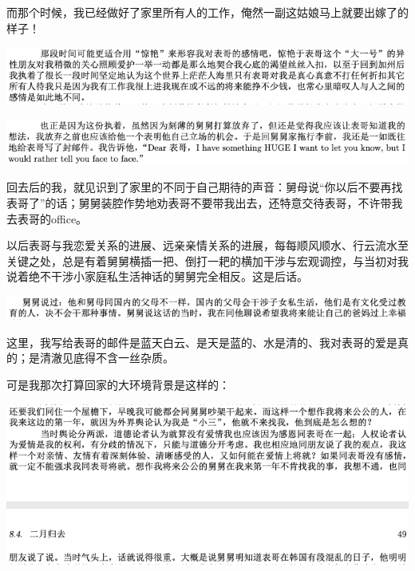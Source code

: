 \documentclass[9pt, b5paper]{article}
\begin{document}
而那个时候，我已经做好了家里所有人的工作，俺然一副这姑娘马上就要出嫁了的样子！

\begin{center}
\includegraphics[width=.9\linewidth]{./pic/p1p49-0.png}
\end{center}

\begin{center}
\includegraphics[width=.9\linewidth]{./pic/p1p49.png}
\end{center}

回去后的我，就见识到了家里的不同于自己期待的声音：舅母说“你以后不要再找表哥了”的话；舅舅装腔作势地劝表哥不要带我出去，还特意交待表哥，不许带我去表哥的office。

以后表哥与我恋爱关系的进展、远亲亲情关系的进展，每每顺风顺水、行云流水至关键之处，总是有着舅舅横插一把、倒打一耙的横加干涉与宏观调控，与当初对我说着绝不干涉小家庭私生活神话的舅舅完全相反。这是后话。 

\begin{center}
\includegraphics[width=.9\linewidth]{./pic/p1p112.png}
\end{center}

这里，我写给表哥的邮件是蓝天白云、是天是蓝的、水是清的、我对表哥的爱是真的；是清澈见底得不含一丝杂质。

可是我那次打算回家的大环境背景是这样的：

\begin{center}
\includegraphics[width=.9\linewidth]{./pic/p1p48-4.png}
\end{center}
\end{document}
